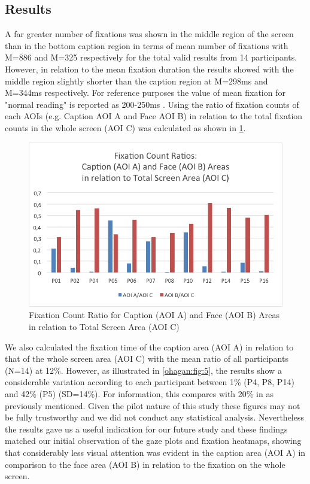 \documentclass[output=paper]{langsci/langscibook}
\begin{document}
\subsection{Results}

A far greater number of fixations was shown in the middle region of the screen than in the bottom caption region in terms of mean number of fixations with M=886 and M=325 respectively for the total valid results from 14 participants. However, in relation to the mean fixation duration the results showed with the middle region slightly shorter than the caption region at M=298ms and M=344ms respectively. For reference purposes the value of mean fixation for "normal reading" is reported as 200-250ms \citep{Bruycker2007}. Using the ratio of fixation counts of each AOIs (e.g. Caption AOI A and Face AOI B) in relation to the total fixation counts in the whole screen (AOI C) was calculated as shown in \ref{ohagan:fig:4}. 

\begin{figure}
 \includegraphics[width=\textwidth]{figures/OHagan4.png}
\caption{Fixation Count Ratio for Caption (AOI A) and Face (AOI B) Areas in relation to Total Screen Area (AOI C) }
\label{ohagan:fig:4}
\end{figure}

We also calculated the fixation time of the caption area (AOI A) in relation to that of the whole screen area (AOI C) with the mean ratio of all participants (N=14) at 12\%.  However, as illustrated in \ref{ohagan:fig:5}, the results show a considerable variation according to each participant between 1\% (P4, P8, P14) and 42\% (P5) (SD=14\%).  For information, this compares with 20\% in \citet{dydewalle1991} as previously mentioned. Given the pilot nature of this study these figures may not be fully trustworthy and we did not conduct any statistical analysis. Nevertheless the results gave us a useful indication for our future study and these findings matched our initial observation of the gaze plots and fixation heatmaps, showing that considerably less visual attention was evident in the caption area (AOI A) in comparison to the face area (AOI B) in relation to the fixation on the whole screen.  
\end{document}
